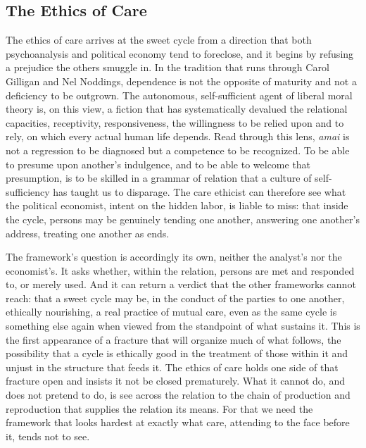 \subsection{The Ethics of Care}

The ethics of care arrives at the sweet cycle from a direction that both psychoanalysis and political economy tend to foreclose, and it begins by refusing a prejudice the others smuggle in. In the tradition that runs through Carol Gilligan and Nel Noddings, dependence is not the opposite of maturity and not a deficiency to be outgrown. The autonomous, self-sufficient agent of liberal moral theory is, on this view, a fiction that has systematically devalued the relational capacities, receptivity, responsiveness, the willingness to be relied upon and to rely, on which every actual human life depends. Read through this lens, \textit{amai} is not a regression to be diagnosed but a competence to be recognized. To be able to presume upon another's indulgence, and to be able to welcome that presumption, is to be skilled in a grammar of relation that a culture of self-sufficiency has taught us to disparage. The care ethicist can therefore see what the political economist, intent on the hidden labor, is liable to miss: that inside the cycle, persons may be genuinely tending one another, answering one another's address, treating one another as ends.

The framework's question is accordingly its own, neither the analyst's nor the economist's. It asks whether, within the relation, persons are met and responded to, or merely used. And it can return a verdict that the other frameworks cannot reach: that a sweet cycle may be, in the conduct of the parties to one another, ethically nourishing, a real practice of mutual care, even as the same cycle is something else again when viewed from the standpoint of what sustains it. This is the first appearance of a fracture that will organize much of what follows, the possibility that a cycle is ethically good in the treatment of those within it and unjust in the structure that feeds it. The ethics of care holds one side of that fracture open and insists it not be closed prematurely. What it cannot do, and does not pretend to do, is see across the relation to the chain of production and reproduction that supplies the relation its means. For that we need the framework that looks hardest at exactly what care, attending to the face before it, tends not to see.

